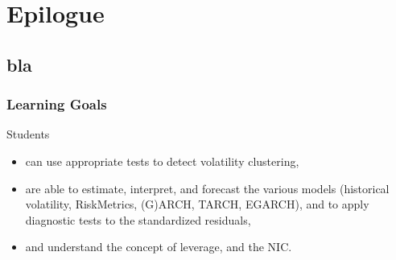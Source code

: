 \section{Epilogue}\subsection*{bla}
\begin{frame}\frametitle{Learning Goals}
Students
\begin{itemize}
\item can use appropriate tests to detect volatility clustering,
\item are able to estimate, interpret, and forecast the various models (historical volatility, RiskMetrics, (G)ARCH, TARCH, EGARCH),
and to apply diagnostic tests to the standardized residuals,
\item and understand the concept of leverage, and the NIC.

\end{itemize}

\end{frame}




